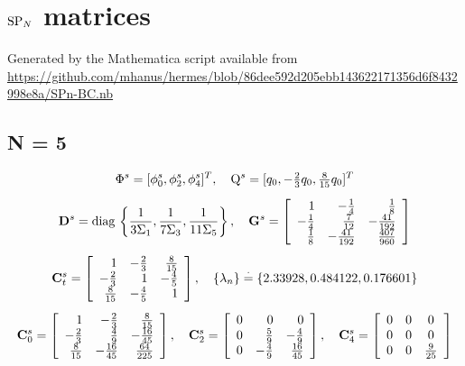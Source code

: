 \chapter{$\text{SP}_{N}$ matrices}\label{app:SPN}
Generated by the Mathematica script available from
\url{https://github.com/mhanus/hermes/blob/86dee592d205ebb143622171356d6f8432998e8a/SPn-BC.nb}
\section{N = 5}
$$
\begin{gathered}
\Phi^s = [\phi^s_0, \phi^s_2, \phi^s_4]^T,\quad \mathrm{Q}^s = [q_0, -\tfrac{2}{3} q_0, \tfrac{8}{15}q_0]^T\\[.5em]
\mathbf{D}^s = \operatorname{diag\,} \left\{\frac{1}{3\Sigma_1}, \frac{1}{7\Sigma_3}, \frac{1}{11\Sigma_5}\right\},\quad
\mathbf{G}^s = \left[
\begin{array}{rrr}
 1 & -\frac{1}{4} & \frac{1}{8} \\
 -\frac{1}{4} & \frac{7}{12} & -\frac{41}{192} \\
 \frac{1}{8} & -\frac{41}{192} & \frac{407}{960} \\
\end{array}
\right]\\[.5em]
\mathbf{C}^s_t = \left[
\begin{array}{rrr}
 1 & -\frac{2}{3} & \frac{8}{15} \\
 -\frac{2}{3} & 1 & -\frac{4}{5} \\
 \frac{8}{15} & -\frac{4}{5} & 1 \\
\end{array}
\right],\quad \{\lambda_n\} \stackrel{\cdot}{=} \{2.33928,0.484122,0.176601\}\\[.5em]
\mathbf{C}^s_0 = \left[
\begin{array}{rrr}
 1 & -\frac{2}{3} & \frac{8}{15} \\
 -\frac{2}{3} & \frac{4}{9} & -\frac{16}{45} \\
 \frac{8}{15} & -\frac{16}{45} & \frac{64}{225}
\end{array}
\right],\quad
\mathbf{C}^s_2 = \left[
\begin{array}{rrr}
 0 & 0 & 0 \\
 0 & \frac{5}{9} & -\frac{4}{9} \\
 0 & -\frac{4}{9} & \frac{16}{45} \\
\end{array}
\right],\quad
\mathbf{C}^s_4 = \left[
\begin{array}{ccc}
 0 & 0 & 0 \\
 0 & 0 & 0 \\
 0 & 0 & \frac{9}{25} \\
\end{array}
\right]
\end{gathered}
$$
